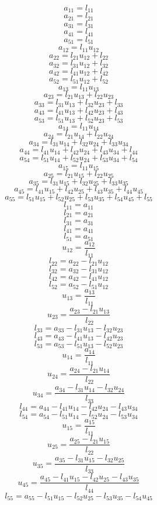 \documentclass[10pt,a4paper,dvipdfmx]{article}
\begin{document}
\begin{multicols}{2}
$$ a_{{1}{1}} = l_{{1}{1}} $$
$$ a_{{2}{1}} = l_{{2}{1}} $$
$$ a_{{3}{1}} = l_{{3}{1}} $$
$$ a_{{4}{1}} = l_{{4}{1}} $$
$$ a_{{5}{1}} = l_{{5}{1}} $$
$$ a_{{1}{2}} = l_{{1}{1}} u_{{1}{2}} $$
$$ a_{{2}{2}} = l_{{2}{1}} u_{{1}{2}} + l_{{2}{2}} $$
$$ a_{{3}{2}} = l_{{3}{1}} u_{{1}{2}} + l_{{3}{2}} $$
$$ a_{{4}{2}} = l_{{4}{1}} u_{{1}{2}} + l_{{4}{2}} $$
$$ a_{{5}{2}} = l_{{5}{1}} u_{{1}{2}} + l_{{5}{2}} $$
$$ a_{{1}{3}} = l_{{1}{1}} u_{{1}{3}} $$
$$ a_{{2}{3}} = l_{{2}{1}} u_{{1}{3}} + l_{{2}{2}} u_{{2}{3}} $$
$$ a_{{3}{3}} = l_{{3}{1}} u_{{1}{3}} + l_{{3}{2}} u_{{2}{3}} + l_{{3}{3}} $$
$$ a_{{4}{3}} = l_{{4}{1}} u_{{1}{3}} + l_{{4}{2}} u_{{2}{3}} + l_{{4}{3}} $$
$$ a_{{5}{3}} = l_{{5}{1}} u_{{1}{3}} + l_{{5}{2}} u_{{2}{3}} + l_{{5}{3}} $$
$$ a_{{1}{4}} = l_{{1}{1}} u_{{1}{4}} $$
$$ a_{{2}{4}} = l_{{2}{1}} u_{{1}{4}} + l_{{2}{2}} u_{{2}{4}} $$
$$ a_{{3}{4}} = l_{{3}{1}} u_{{1}{4}} + l_{{3}{2}} u_{{2}{4}} + l_{{3}{3}} u_{{3}{4}} $$
$$ a_{{4}{4}} = l_{{4}{1}} u_{{1}{4}} + l_{{4}{2}} u_{{2}{4}} + l_{{4}{3}} u_{{3}{4}} + l_{{4}{4}} $$
$$ a_{{5}{4}} = l_{{5}{1}} u_{{1}{4}} + l_{{5}{2}} u_{{2}{4}} + l_{{5}{3}} u_{{3}{4}} + l_{{5}{4}} $$
$$ a_{{1}{5}} = l_{{1}{1}} u_{{1}{5}} $$
$$ a_{{2}{5}} = l_{{2}{1}} u_{{1}{5}} + l_{{2}{2}} u_{{2}{5}} $$
$$ a_{{3}{5}} = l_{{3}{1}} u_{{1}{5}} + l_{{3}{2}} u_{{2}{5}} + l_{{3}{3}} u_{{3}{5}} $$
$$ a_{{4}{5}} = l_{{4}{1}} u_{{1}{5}} + l_{{4}{2}} u_{{2}{5}} + l_{{4}{3}} u_{{3}{5}} + l_{{4}{4}} u_{{4}{5}} $$
$$ a_{{5}{5}} = l_{{5}{1}} u_{{1}{5}} + l_{{5}{2}} u_{{2}{5}} + l_{{5}{3}} u_{{3}{5}} + l_{{5}{4}} u_{{4}{5}} + l_{{5}{5}} $$
\vfill\null
\columnbreak
$$ l_{{1}{1}} = a_{{1}{1}} $$
$$ l_{{2}{1}} = a_{{2}{1}} $$
$$ l_{{3}{1}} = a_{{3}{1}} $$
$$ l_{{4}{1}} = a_{{4}{1}} $$
$$ l_{{5}{1}} = a_{{5}{1}} $$
$$ u_{{1}{2}} = \dfrac{a_{{1}{2}}}{l_{{1}{1}}} $$
$$ l_{{2}{2}} = a_{{2}{2}}- l_{{2}{1}} u_{{1}{2}} $$
$$ l_{{3}{2}} = a_{{3}{2}}- l_{{3}{1}} u_{{1}{2}} $$
$$ l_{{4}{2}} = a_{{4}{2}}- l_{{4}{1}} u_{{1}{2}} $$
$$ l_{{5}{2}} = a_{{5}{2}}- l_{{5}{1}} u_{{1}{2}} $$
$$ u_{{1}{3}} = \dfrac{a_{{1}{3}}}{l_{{1}{1}}} $$
$$ u_{{2}{3}} = \dfrac{a_{{2}{3}}- l_{{2}{1}} u_{{1}{3}}}{l_{{2}{2}}} $$
$$ l_{{3}{3}} = a_{{3}{3}}- l_{{3}{1}} u_{{1}{3}}- l_{{3}{2}} u_{{2}{3}} $$
$$ l_{{4}{3}} = a_{{4}{3}}- l_{{4}{1}} u_{{1}{3}}- l_{{4}{2}} u_{{2}{3}} $$
$$ l_{{5}{3}} = a_{{5}{3}}- l_{{5}{1}} u_{{1}{3}}- l_{{5}{2}} u_{{2}{3}} $$
$$ u_{{1}{4}} = \dfrac{a_{{1}{4}}}{l_{{1}{1}}} $$
$$ u_{{2}{4}} = \dfrac{a_{{2}{4}}- l_{{2}{1}} u_{{1}{4}}}{l_{{2}{2}}} $$
$$ u_{{3}{4}} = \dfrac{a_{{3}{4}}- l_{{3}{1}} u_{{1}{4}}- l_{{3}{2}} u_{{2}{4}}}{l_{{3}{3}}} $$
$$ l_{{4}{4}} = a_{{4}{4}}- l_{{4}{1}} u_{{1}{4}}- l_{{4}{2}} u_{{2}{4}}- l_{{4}{3}} u_{{3}{4}} $$
$$ l_{{5}{4}} = a_{{5}{4}}- l_{{5}{1}} u_{{1}{4}}- l_{{5}{2}} u_{{2}{4}}- l_{{5}{3}} u_{{3}{4}} $$
$$ u_{{1}{5}} = \dfrac{a_{{1}{5}}}{l_{{1}{1}}} $$
$$ u_{{2}{5}} = \dfrac{a_{{2}{5}}- l_{{2}{1}} u_{{1}{5}}}{l_{{2}{2}}} $$
$$ u_{{3}{5}} = \dfrac{a_{{3}{5}}- l_{{3}{1}} u_{{1}{5}}- l_{{3}{2}} u_{{2}{5}}}{l_{{3}{3}}} $$
$$ u_{{4}{5}} = \dfrac{a_{{4}{5}}- l_{{4}{1}} u_{{1}{5}}- l_{{4}{2}} u_{{2}{5}}- l_{{4}{3}} u_{{3}{5}}}{l_{{4}{4}}} $$
$$ l_{{5}{5}} = a_{{5}{5}}- l_{{5}{1}} u_{{1}{5}}- l_{{5}{2}} u_{{2}{5}}- l_{{5}{3}} u_{{3}{5}}- l_{{5}{4}} u_{{4}{5}} $$
\end{multicols}
\end{document}
